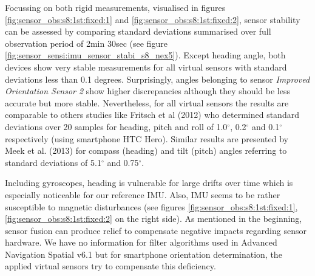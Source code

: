 \documentclass[review]{elsarticle}
\begin{document}
Focussing on both rigid measurements, visualised in figures \ref{fig:sensor_obs:s8:1st:fixed:1} and \ref{fig:sensor_obs:s8:1st:fixed:2}, sensor stability can be assessed by comparing standard deviations summarised over full observation period of 2min 30sec (see figure \ref{fig:sensor_sensi:imu_sensor_stabi_s8_nex5}). Except heading angle, both devices show very stable measurements for all virtual sensors with standard deviations less than 0.1 degrees. Surprisingly, angles belonging to sensor \textit{Improved Orientation Sensor 2} show higher discrepancies although they should be less accurate but more stable. Nevertheless, for all virtual sensors the results are comparable to others studies like Fritsch et al (2012)\cite{Fritsch2012} who determined standard deviations over 20 samples for heading, pitch and roll of 1.0$^\circ$, 0.2$^\circ$ and 0.1$^\circ$ respectively (using smartphone HTC Hero). Similar results are presented by Meek et al. (2013) \cite{Meek2013} for compass (heading) and tilt (pitch) angles referring to standard deviations of 5.1$^\circ$ and 0.75$^\circ$.

Including gyroscopes, heading is vulnerable for large drifts over time \cite{Kok2017} which is 
especially noticeable for our reference \gls{IMU}. Also, \gls{IMU} seems to be rather susceptible to magnetic disturbances (see figures \ref{fig:sensor_obs:s8:1st:fixed:1},\ref{fig:sensor_obs:s8:1st:fixed:2} on the right side). As mentioned in the beginning, sensor fusion can produce relief to compensate negative impacts regarding sensor hardware. We have no information for filter algorithms used in Advanced Navigation Spatial v6.1 but for smartphone orientation determination, the applied virtual sensors try to compensate this deficiency. 
\end{document}
